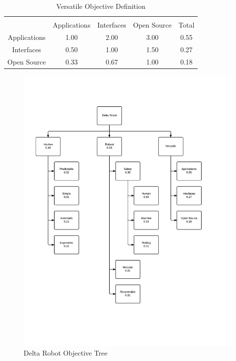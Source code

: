 \documentclass[11pt]{report}
\begin{document}
\begin{table}[ht] 
	\caption{Versatile Objective Definition}
	\label{table:versatile}
	\centering 
	\begin{tabular}{c c c c c} 
		\hline\hline \\
		 			& Applications& Interfaces	& Open Source	& Total\\ 
		Applications	& 1.00 		& 2.00		& 3.00 		& 0.55 \\ 
		Interfaces	& 0.50		& 1.00 		& 1.50		& 0.27 \\ 
		Open Source 	& 0.33 		& 0.67 		& 1.00 		& 0.18 \\ 
	\end{tabular} 
\end{table}

\begin{figure}[p]
	\centering
	\includegraphics[width=.8\textwidth]{objectivetree.png}
	\caption{Delta Robot Objective Tree}
	\label{fig:objectivetree}
\end{figure}
\end{document}
